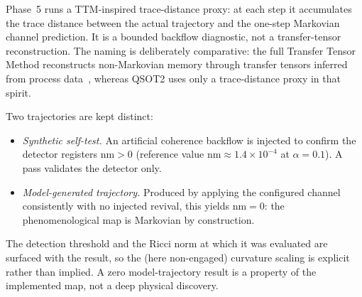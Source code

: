 Phase~5 runs a TTM-inspired trace-distance proxy: at each step it accumulates the trace
distance between the actual trajectory and the one-step Markovian channel prediction. It
is a bounded backflow diagnostic, not a transfer-tensor reconstruction. The naming is
deliberately comparative: the full Transfer Tensor Method reconstructs non-Markovian
memory through transfer tensors inferred from process data~\cite{CerrilloCao2014},
whereas QSOT2 uses only a trace-distance proxy in that spirit.

Two trajectories are kept distinct:

\begin{itemize}[leftmargin=1.5em]
\item \emph{Synthetic self-test.} An artificial coherence backflow is injected to confirm
  the detector registers $\mathrm{nm} > 0$ (reference value
  $\mathrm{nm} \approx 1.4\times10^{-4}$ at $\alpha=0.1$). A pass validates the detector
  only.
\item \emph{Model-generated trajectory.} Produced by applying the configured channel
  consistently with no injected revival, this yields $\mathrm{nm} = 0$: the
  phenomenological map is Markovian by construction.
\end{itemize}

The detection threshold and the Ricci norm at which it was evaluated are surfaced with
the result, so the (here non-engaged) curvature scaling is explicit rather than implied.
A zero model-trajectory result is a property of the implemented map, not a deep physical
discovery.
